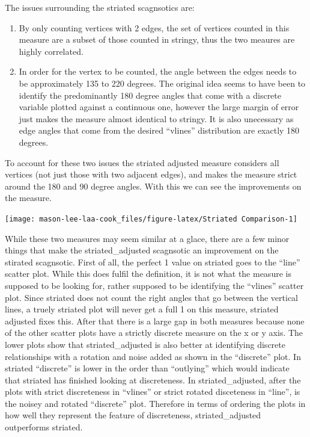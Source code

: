 The issues surrounding the striated scagnsotics are:

\begin{enumerate}
\def\labelenumi{\arabic{enumi}.}
\item
  By only counting vertices with 2 edges, the set of vertices counted in
  this measure are a subset of those counted in stringy, thus the two
  meaures are highly correlated.
\item
  In order for the vertex to be counted, the angle between the edges
  needs to be approximately 135 to 220 degrees. The original idea seems
  to have been to identify the predominantly 180 degree angles that come
  with a discrete variable plotted against a continuous one, however the
  large margin of error just makes the measure almost identical to
  stringy. It is also unecessary as edge angles that come from the
  desired ``vlines'' distribution are exactly 180 degrees.
\end{enumerate}

To account for these two issues the striated adjusted measure considers
all vertices (not just those with two adjacent edges), and makes the
measure strict around the 180 and 90 degree angles. With this we can see
the improvements on the measure.

\begin{Schunk}

\texttt{[image: mason-lee-laa-cook\_files/figure-latex/Striated Comparison-1]} \end{Schunk}

While these two measures may seem similar at a glace, there are a few
minor things that make the striated\_adjusted scagnsotic an improvement
on the stirated scagnsotic. First of all, the perfect 1 value on
striated goes to the ``line'' scatter plot. While this does fulfil the
definition, it is not what the measure is supposed to be looking for,
rather supposed to be identifying the ``vlines'' scatter plot. Since
striated does not count the right angles that go between the vertical
lines, a truely striated plot will never get a full 1 on this measure,
striated adjusted fixes this. After that there is a large gap in both
measures because none of the other scatter plots have a strictly
discrete measure on the x or y axis. The lower plots show that
striated\_adjusted is also better at identifying discrete relationships
with a rotation and noise added as shown in the ``discrete'' plot. In
striated ``discrete'' is lower in the order than ``outlying'' which
would indicate that striated has finished looking at discreteness. In
striated\_adjusted, after the plots with strict discreteness in
``vlines'' or strict rotated disceteness in ``line'', is the noisey and
rotated ``discrete'' plot. Therefore in terms of ordering the plots in
how well they represent the feature of discreteness, striated\_adjusted
outperforms striated.

